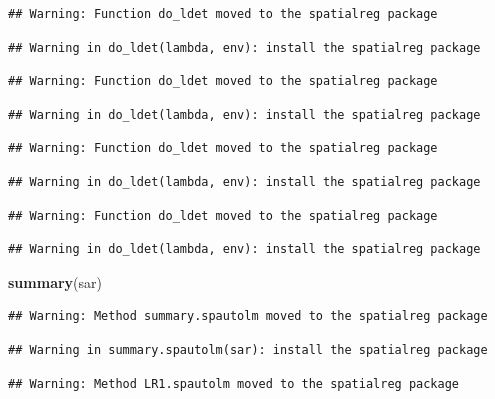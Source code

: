 \documentclass[11pt,]{article}
\newenvironment{Shaded}{\begin{snugshade}}{\end{snugshade}}
\newcommand{\KeywordTok}[1]{\textcolor[rgb]{0.13,0.29,0.53}{\textbf{#1}}}
\newcommand{\NormalTok}[1]{#1}
\begin{document}
\begin{verbatim}
## Warning: Function do_ldet moved to the spatialreg package
\end{verbatim}

\begin{verbatim}
## Warning in do_ldet(lambda, env): install the spatialreg package
\end{verbatim}

\begin{verbatim}
## Warning: Function do_ldet moved to the spatialreg package
\end{verbatim}

\begin{verbatim}
## Warning in do_ldet(lambda, env): install the spatialreg package
\end{verbatim}

\begin{verbatim}
## Warning: Function do_ldet moved to the spatialreg package
\end{verbatim}

\begin{verbatim}
## Warning in do_ldet(lambda, env): install the spatialreg package
\end{verbatim}

\begin{verbatim}
## Warning: Function do_ldet moved to the spatialreg package
\end{verbatim}

\begin{verbatim}
## Warning in do_ldet(lambda, env): install the spatialreg package
\end{verbatim}

\begin{Shaded}
\begin{Highlighting}[]
\KeywordTok{summary}\NormalTok{(sar)}
\end{Highlighting}
\end{Shaded}

\begin{verbatim}
## Warning: Method summary.spautolm moved to the spatialreg package
\end{verbatim}

\begin{verbatim}
## Warning in summary.spautolm(sar): install the spatialreg package
\end{verbatim}

\begin{verbatim}
## Warning: Method LR1.spautolm moved to the spatialreg package
\end{verbatim}
\end{document}
